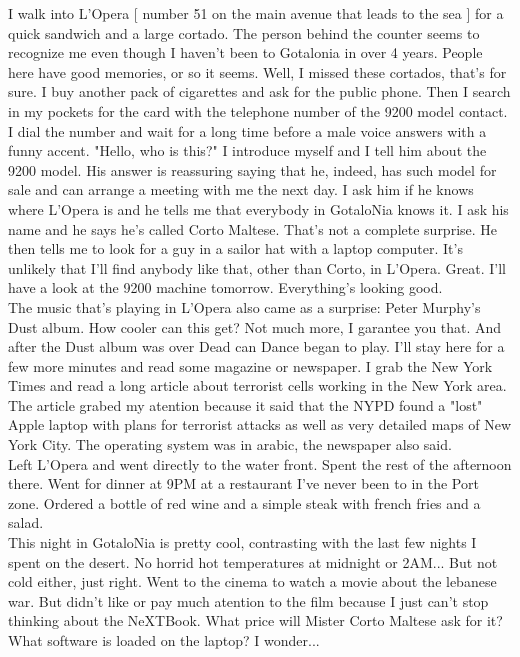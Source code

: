 \documentclass[11pt,twoside,a4paper]{book}
\begin{document}
\begin{multicols*}{2}
I walk into L'Opera [ number 51 on the main avenue that leads to the sea ] for a quick sandwich and a large cortado. The person behind the counter seems to recognize me even though I haven't been to Gotalonia in over 4 years. People here have good memories, or so it seems. Well, I missed these cortados, that's for sure. I buy another pack of cigarettes and ask for the public phone. Then I search in my pockets for the card with the telephone number of the 9200 model contact. I dial the number and wait for a long time before a male voice answers with a funny accent. "Hello, who is this?" I introduce myself and I tell him about the 9200 model. His answer is reassuring saying that he, indeed, has such model for sale and can arrange a meeting with me the next day. I ask him if he knows where L'Opera is and he tells me that everybody in GotaloNia knows it. I ask his name and he says he's called Corto Maltese. That's not a complete surprise. He then tells me to look for a guy in a sailor hat with a laptop computer. It's unlikely that I'll find anybody like that, other than Corto, in L'Opera. Great. I'll have a look at the 9200 machine tomorrow. Everything's looking good. ~\\

The music that's playing in L'Opera also came as a surprise: Peter Murphy's Dust album. How cooler can this get? Not much more, I garantee you that. And after the Dust album was over Dead can Dance began to play. I'll stay here for a few more minutes and read some magazine or newspaper. I grab the New York Times and read a long article about terrorist cells working in the New York area. The article grabed my atention because it said that the NYPD found a "lost" Apple laptop with plans for terrorist attacks as well as very detailed maps of New York City. The operating system was in arabic, the newspaper also said. ~\\

Left L'Opera and went directly to the water front. Spent the rest of the afternoon there. Went for dinner at 9PM at a restaurant I've never been to in the Port zone. Ordered a bottle of red wine and a simple steak with french fries and a salad. ~\\

This night in GotaloNia is pretty cool, contrasting with the last few nights I spent on the desert. No horrid hot temperatures at midnight or 2AM... But not cold either, just right. Went to the cinema to watch a movie about the lebanese war. But didn't like or pay much atention to the film because I just can't stop thinking about the NeXTBook. What price will Mister Corto Maltese ask for it? What software is loaded on the laptop? I wonder... ~\\


\end{multicols*}
\end{document}
